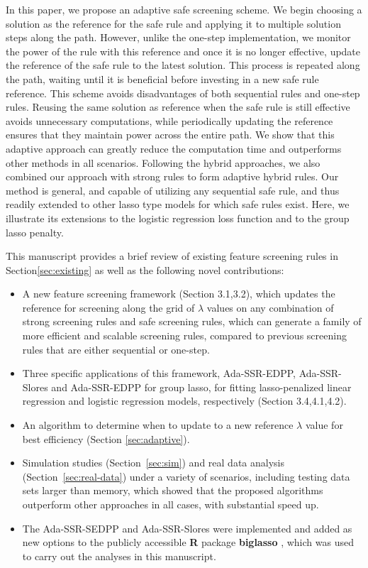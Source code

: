 In this paper, we propose an adaptive safe screening scheme. We begin choosing a solution as the reference for the safe rule and applying it to multiple solution steps along the path. However, unlike the one-step implementation, we monitor the power of the rule with this reference and once it is no longer effective, update the reference of the safe rule to the latest solution.  This process is repeated along the path, waiting until it is beneficial before investing in a new safe rule reference. This scheme avoids disadvantages of both sequential rules and one-step rules. Reusing the same solution as reference when the safe rule is still effective avoids unnecessary computations, while periodically updating the reference ensures that they maintain power across the entire path. We show that this adaptive approach can greatly reduce the computation time and outperforms other methods in all scenarios. Following the hybrid approaches, we also combined our approach with strong rules to form adaptive hybrid rules. Our method is general, and capable of utilizing any sequential safe rule, and thus readily extended to other lasso type models for which safe rules exist. Here, we illustrate its extensions to the logistic regression loss function and to the group lasso penalty.

This manuscript provides a brief review of existing feature screening rules in Section\ref{sec:existing} as well as the following novel contributions:

\begin{itemize}
    \item A new feature screening framework (Section 3.1,3.2), which updates the reference for screening along the grid of $\lambda$ values on any combination of strong screening rules and safe screening rules, which can generate a family of more efficient and scalable screening rules, compared to previous screening rules that are either sequential or one-step.
    \item Three specific applications of this framework, Ada-SSR-EDPP, Ada-SSR-Slores and Ada-SSR-EDPP for group lasso, for fitting lasso-penalized linear regression and logistic regression models, respectively (Section 3.4,4.1,4.2).
    \item An algorithm to determine when to update to a new reference $\lambda$ value for best efficiency (Section \ref{sec:adaptive}).
    \item Simulation studies (Section~\ref{sec:sim}) and real data analysis (Section~\ref{sec:real-data}) under a variety of scenarios, including testing data sets larger than memory, which showed that the proposed algorithms outperform other approaches in all cases, with substantial speed up.
    \item The Ada-SSR-SEDPP and Ada-SSR-Slores were implemented and added as new options to the publicly accessible \textbf{R} package \textbf{biglasso} \citep{zeng2017biglasso}, which was used to carry out the analyses in this manuscript.
\end{itemize}

